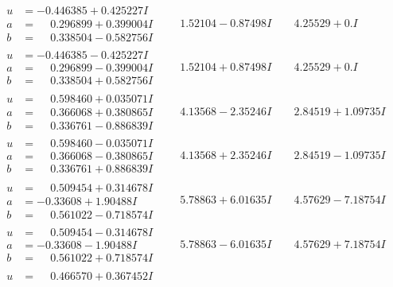 \documentclass[1p]{elsarticle_modified}
\theoremstyle{definition}
\begin{document}
$$\begin{array}{c|c|c}
\begin{aligned}
u &= -0.446385 + 0.425227 I \\
a &= \phantom{-}0.296899 + 0.399004 I \\
b &= \phantom{-}0.338504 - 0.582756 I\end{aligned}
 & \phantom{-}1.52104 - 0.87498 I & \phantom{-}4.25529 + 0. I\phantom{ +0.000000I} \\ \hline\begin{aligned}
u &= -0.446385 - 0.425227 I \\
a &= \phantom{-}0.296899 - 0.399004 I \\
b &= \phantom{-}0.338504 + 0.582756 I\end{aligned}
 & \phantom{-}1.52104 + 0.87498 I & \phantom{-}4.25529 + 0. I\phantom{ +0.000000I} \\ \hline\begin{aligned}
u &= \phantom{-}0.598460 + 0.035071 I \\
a &= \phantom{-}0.366068 + 0.380865 I \\
b &= \phantom{-}0.336761 - 0.886839 I\end{aligned}
 & \phantom{-}4.13568 - 2.35246 I & \phantom{-}2.84519 + 1.09735 I \\ \hline\begin{aligned}
u &= \phantom{-}0.598460 - 0.035071 I \\
a &= \phantom{-}0.366068 - 0.380865 I \\
b &= \phantom{-}0.336761 + 0.886839 I\end{aligned}
 & \phantom{-}4.13568 + 2.35246 I & \phantom{-}2.84519 - 1.09735 I \\ \hline\begin{aligned}
u &= \phantom{-}0.509454 + 0.314678 I \\
a &= -0.33608 + 1.90488 I \\
b &= \phantom{-}0.561022 - 0.718574 I\end{aligned}
 & \phantom{-}5.78863 + 6.01635 I & \phantom{-}4.57629 - 7.18754 I \\ \hline\begin{aligned}
u &= \phantom{-}0.509454 - 0.314678 I \\
a &= -0.33608 - 1.90488 I \\
b &= \phantom{-}0.561022 + 0.718574 I\end{aligned}
 & \phantom{-}5.78863 - 6.01635 I & \phantom{-}4.57629 + 7.18754 I \\ \hline\begin{aligned}
u &= \phantom{-}0.466570 + 0.367452 I \\

\end{aligned}
\end{array}$$
\end{document}
